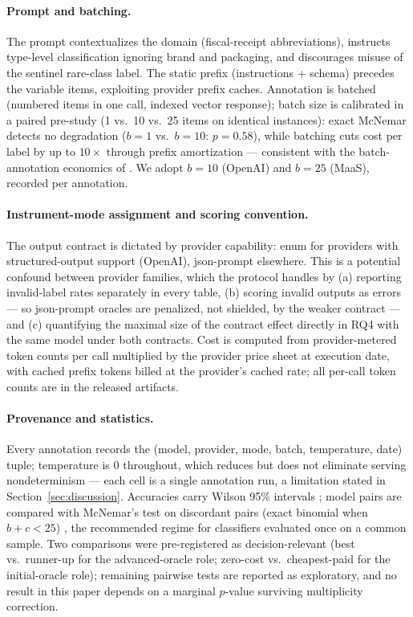 \documentclass[11pt]{article}
\begin{document}
\paragraph{Prompt and batching.} The prompt contextualizes the domain
(fiscal-receipt abbreviations), instructs type-level classification
ignoring brand and packaging, and discourages misuse of the sentinel
rare-class label. The static prefix (instructions + schema) precedes the
variable items, exploiting provider prefix caches. Annotation is batched
(numbered items in one call, indexed vector response); batch size is
calibrated in a paired pre-study (1 vs.\ 10 vs.\ 25 items on identical
instances): exact McNemar detects no degradation ($b{=}1$ vs.\ $b{=}10$:
$p=0.58$), while batching cuts cost per label by up to $10\times$ through
prefix amortization --- consistent with the batch-annotation economics of
\citet{Kholodna2024}. We adopt $b=10$ (OpenAI) and $b=25$ (MaaS), recorded
per annotation.

\paragraph{Instrument-mode assignment and scoring convention.} The output
contract is dictated by provider capability: enum for providers with
structured-output support (OpenAI), json-prompt elsewhere. This is a
potential confound between provider families, which the protocol handles by
(a) reporting invalid-label rates separately in every table, (b) scoring
invalid outputs as errors --- so json-prompt oracles are penalized, not
shielded, by the weaker contract --- and (c) quantifying the maximal size of
the contract effect directly in RQ4 with the same model under both
contracts. Cost is computed from provider-metered token counts per call
multiplied by the provider price sheet at execution date, with cached
prefix tokens billed at the provider's cached rate; all per-call token
counts are in the released artifacts.

\paragraph{Provenance and statistics.} Every annotation records the
(model, provider, mode, batch, temperature, date) tuple; temperature is 0
throughout, which reduces but does not eliminate serving nondeterminism ---
each cell is a single annotation run, a limitation stated in
Section~\ref{sec:discussion}. Accuracies carry Wilson 95\% intervals
\citep{Wilson1927,Brown2001}; model pairs are compared with McNemar's test
on discordant pairs (exact binomial when $b+c<25$)
\citep{McNemar1947,Dietterich1998}, the recommended regime for classifiers
evaluated once on a common sample. Two comparisons were pre-registered as
decision-relevant (best vs.\ runner-up for the advanced-oracle role;
zero-cost vs.\ cheapest-paid for the initial-oracle role); remaining
pairwise tests are reported as exploratory, and no result in this paper
depends on a marginal $p$-value surviving multiplicity correction.
\end{document}
